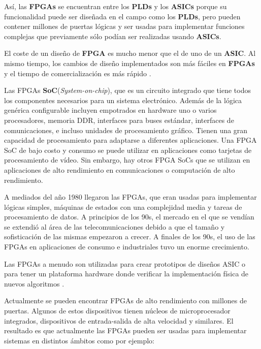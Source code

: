 Así, las \textbf{FPGAs} se encuentran entre los \textbf{PLDs} y los \textbf{ASICs} porque su funcionalidad puede ser diseñada en el campo como 
los \textbf{PLDs}, pero pueden contener millones de puertas lógicas y ser usadas para implementar funciones complejas que previamente sólo 
podían ser realizadas usando \textbf{ASICs}. 

El coste de un diseño de \textbf{FPGA} es mucho menor que el de uno de un \textbf{ASIC}. Al mismo tiempo, los cambios de diseño implementados 
son más fáciles en \textbf{FPGAs} y el tiempo de comercialización es más rápido \cite{maxfield2}.

Las FPGAs \textbf{SoC}(\textit{System-on-chip}), que es un circuito integrado que tiene todos los componentes necesarios para un sistema electrónico.
Además de la lógica genérica configurable incluyen empotrados en hardware uno o varios procesadores, memoria DDR, interfaces para buses 
estándar, interfaces de comunicaciones, e incluso unidades de procesamiento gráfico. Tienen una gran capacidad de procesamiento para 
adaptarse a diferentes aplicaciones. Una FPGA SoC de bajo costo y consumo se puede utilizar en aplicaciones como tarjetas de procesamiento de 
vídeo. Sin embargo, hay otros FPGA SoCs que se utilizan en aplicaciones de alto rendimiento en comunicaciones o computación de alto rendimiento.

A mediados del año 1980 llegaron las FPGAs, que eran usadas para implementar lógicas simples, máquinas de estados con una complejidad media 
y tareas de procesamiento de datos. A principios de los 90s, el mercado en el que se vendían se extendió al área de las telecomunicaciones 
debido a que el tamaño y sofisticación de las mismas empezaron a crecer. A finales de los 90s, el uso de las FPGAs en aplicaciones de consumo 
e industriales tuvo un enorme crecimiento.

Las FPGAs a menudo son utilizadas para crear prototipos de diseños ASIC o para tener un plataforma hardware donde verificar la implementación 
física de nuevos algoritmos \cite{maxfield1}. 

Actualmente se pueden encontrar FPGAs de alto rendimiento con millones de puertas. Algunos de estos dispositivos tienen núcleos de 
microprocesador integrados, dispositivos de entrada-salida de alta velocidad y similares. El resultado es que actualmente las FPGAs pueden ser 
usadas para implementar sistemas en distintos ámbitos como por ejemplo:

